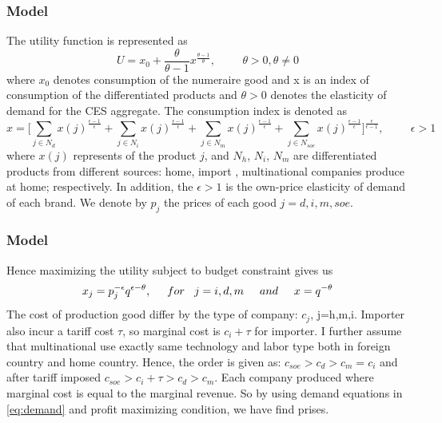 \documentclass[xcolor=dvipsnames]{beamer}
\begin{document}
\begin{frame}
	\frametitle{Model}
The utility function is represented as
\begin{equation}
U=x_0+\frac{\theta}{\theta-1}x^{\frac{\theta-1}{\theta}}, \hspace{1cm} \theta>0, \theta\neq0
\end{equation}
where $ x_0 $ denotes consumption of the numeraire good and x is an index of consumption of the differentiated products and $\theta>0$ denotes the elasticity of demand for the CES aggregate. The consumption index is denoted as
\begin{equation}\label{eq:ces}
x=\bigg[\sum_{j \in N_d}x(j)^\frac{\epsilon-1}{\epsilon}+\sum_{j \in N_i}x(j)^\frac{\epsilon-1}{\epsilon}+\sum_{j \in N_m}x(j)^\frac{\epsilon-1}{\epsilon}+\sum_{j \in N_{soe}}x(j)^\frac{\epsilon-1}{\epsilon}\bigg]^\frac{\epsilon}{\epsilon-1}
, \hspace{1cm} \epsilon>1
\end{equation}
where $ x(j) $ represents of the product $ j $, and  $ N_h$, $N_i $,  $N_m $ are differentiated products from different sources: home, import , multinational companies produce at home; respectively. In addition, the $\epsilon>1$ is the own-price elasticity of demand of each brand. We denote by $p_j$ the prices of each good $j=d,i,m,soe$. 
\end{frame}

\begin{frame}
	\frametitle{Model}
Hence maximizing the utility subject to budget constraint gives us
\begin{equation} \label{eq:demand}
x_j=p_j^{-\epsilon}q^{\epsilon-\theta}, \hspace{0.5cm}for  \hspace{0.3cm} j=i,d,m\hspace{0.5cm} and \hspace{0.5cm} x=q^{-\theta}
\end{equation}
The cost of production good differ by the type of company: $c_j$, j=h,m,i. Importer also incur a tariff cost $\tau$, so marginal cost is $c_i+\tau$ for importer. I further assume that multinational use exactly same technology and labor type both in foreign country and home country. Hence, the order is given as: $c_{soe}>c_d>c_m=c_i$ and after tariff imposed $c_{soe}>c_i+\tau>c_d>c_m$. Each company produced where marginal cost is equal to the marginal revenue. So by using demand equations in \ref{eq:demand} and profit maximizing condition, we have find prises. 
\end{frame}
\end{document}
